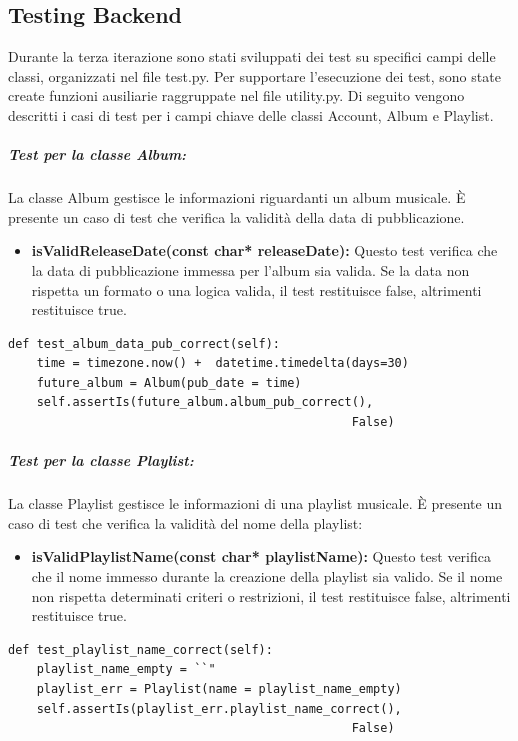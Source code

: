 \subsection{Testing Backend}
Durante la terza iterazione sono stati sviluppati dei test su specifici campi delle classi, organizzati nel file test.py. Per supportare l'esecuzione 
dei test, sono state create funzioni ausiliarie raggruppate nel file utility.py.
Di seguito vengono descritti i casi di test per i campi chiave delle classi Account, Album e Playlist.


\subparagraph{Test per la classe \textbf{Album:}} La classe Album gestisce le informazioni riguardanti un album musicale. È presente un caso di test che verifica la validità della data di pubblicazione.
\begin{itemize}
    \item \textbf{isValidReleaseDate(const char* releaseDate):}
    Questo test verifica che la data di pubblicazione immessa per l'album sia valida. Se la data non rispetta un formato o una logica valida, il test restituisce false, altrimenti restituisce true.
\end{itemize}

\begin{lstlisting}[caption={class AlbumModelTests(TestCase)}, captionpos=b]
def test_album_data_pub_correct(self):
    time = timezone.now() +  datetime.timedelta(days=30)
    future_album = Album(pub_date = time)
    self.assertIs(future_album.album_pub_correct(), 
                                                False)
\end{lstlisting} 


\subparagraph{Test per la classe \textbf{Playlist:}} La classe Playlist gestisce le informazioni di una playlist musicale. È presente un caso di test che verifica la validità del nome della playlist:
\begin{itemize}
    \item \textbf{isValidPlaylistName(const char* playlistName):}
    Questo test verifica che il nome immesso durante la creazione della playlist sia valido. Se il nome non rispetta determinati criteri o restrizioni, il test restituisce false, altrimenti restituisce true.
\end{itemize}
\begin{lstlisting}[caption={PlaylistModelTests(TestCase)}, captionpos=b]
def test_playlist_name_correct(self):
    playlist_name_empty = ``"
    playlist_err = Playlist(name = playlist_name_empty)
    self.assertIs(playlist_err.playlist_name_correct(), 
                                                False)
\end{lstlisting} 



